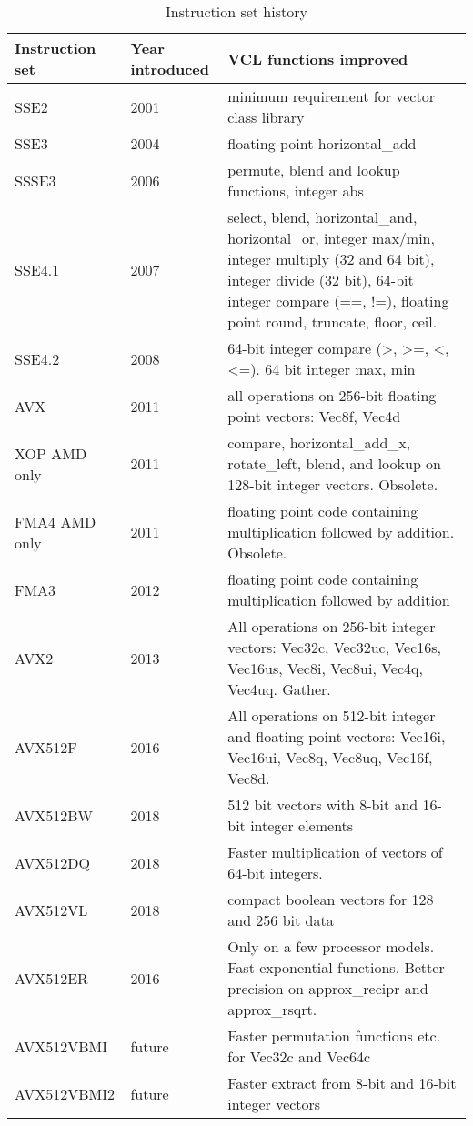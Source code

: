\documentclass[vcl_manual.tex]{subfiles}
\begin{document}
\begin {table}[h]
\caption{Instruction set history}
\label{table:instructionSetHistory}
\begin{tabular}{|p{24mm}|p{22mm}|p{100mm}|}
\hline
\bfseries Instruction \newline set & \bfseries Year \newline introduced & \bfseries VCL functions improved \\ \hline
SSE2 & 2001 & minimum requirement for vector class library \\ \hline
SSE3 & 2004 & floating point horizontal\_add \\ \hline
SSSE3 & 2006 & permute, blend and lookup functions, integer abs \\ \hline
SSE4.1 & 2007 & select, blend, horizontal\_and, horizontal\_or, integer max/min, integer multiply (32 and 64 bit), integer divide (32 bit), 64-bit integer compare (==, !=), floating point round, truncate, floor, ceil. \\ \hline
SSE4.2 & 2008 & 64-bit integer compare (\textgreater, \textgreater =, \textless, \textless =). 64 bit integer max, min \\ \hline
AVX & 2011 & all operations on 256-bit floating point vectors: Vec8f, Vec4d \\ \hline
XOP \newline AMD only & 2011 & compare, horizontal\_add\_x, rotate\_left, blend, and lookup on 128-bit integer vectors. Obsolete. \\ \hline
FMA4 \newline AMD only & 2011 & floating point code containing multiplication followed by addition. Obsolete. \\ \hline
FMA3 & 2012 & floating point code containing multiplication followed by addition \\ \hline
AVX2 & 2013 & All operations on 256-bit integer vectors: Vec32c, Vec32uc, Vec16s, Vec16us, Vec8i, Vec8ui, Vec4q, Vec4uq. Gather. \\ \hline
AVX512F & 2016 & All operations on 512-bit integer and floating point vectors: Vec16i, Vec16ui, Vec8q, Vec8uq, Vec16f, Vec8d. \\ \hline
AVX512BW & 2018 & 512 bit vectors with 8-bit and 16-bit integer elements \\ \hline
AVX512DQ & 2018 & Faster multiplication of vectors of 64-bit integers. \\ \hline
AVX512VL & 2018 & compact boolean vectors for 128 and 256 bit data \\ \hline
AVX512ER & 2016 & Only on a few processor models. Fast exponential functions. Better precision on approx\_recipr and approx\_rsqrt. \\ \hline
AVX512VBMI & future & Faster permutation functions etc. for Vec32c and Vec64c \\ \hline
AVX512VBMI2 & future & Faster extract from 8-bit and 16-bit integer vectors \\ \hline
\end{tabular}
\end{table}
\end{document}
